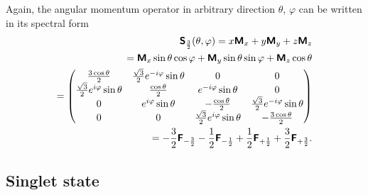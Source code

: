 \documentclass[%
  twocolumn,
 showpacs,
 showkeys,
 preprintnumbers,
 amsmath,amssymb,
 aps,
  pra,
  longbibliography,
 floatfix,
 ]{revtex4-1}
\begin{document}
Again, the angular momentum operator in arbitrary direction $\theta$, $\varphi$ can be written in its spectral form
\begin{equation}
\begin{split}
\textsf{\textbf{S}}_\frac{3}{2} (\theta ,\varphi) =
x\textsf{\textbf{M}}_x
+
y\textsf{\textbf{M}}_y
+
z\textsf{\textbf{M}}_z  \\
=
 \textsf{\textbf{M}}_x  \sin \theta \cos \varphi
+
\textsf{\textbf{M}}_y   \sin \theta \sin \varphi
+
\textsf{\textbf{M}}_z   \cos \theta
\\
=\begin{pmatrix}
 \frac{3 \cos \theta }{2} & \frac{\sqrt{3}}{2}  e^{-i \varphi } \sin \theta  & 0 & 0 \\
 \frac{\sqrt{3}}{2}  e^{i \varphi } \sin \theta  & \frac{\cos \theta }{2} & e^{-i \varphi } \sin \theta  & 0 \\
 0 & e^{i \varphi } \sin \theta  & -\frac{\cos \theta }{2} & \frac{\sqrt{3}}{2}  e^{-i \varphi } \sin \theta  \\
 0 & 0 & \frac{ \sqrt{3}}{2} e^{i \varphi } \sin \theta  & -\frac{3 \cos \theta }{2}
\end{pmatrix}
 \\
= -\frac{3}{2}\textsf{\textbf{F}}_{-\frac{3}{2}}  - \frac{1}{2} \textsf{\textbf{F}}_{-\frac{1}{2}} +
\frac{1}{2}\textsf{\textbf{F}}_{+\frac{1}{2}} + \frac{3}{2}\textsf{\textbf{F}}_{+\frac{3}{2}}.
\end{split}
\label{e-2009-gtq-s444}
\end{equation}



\subsection{Singlet state}
\end{document}
